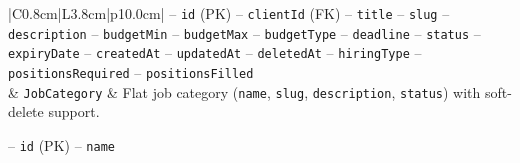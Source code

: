 \begin{center}
\begin{longtable}{|C{0.8cm}|L{3.8cm}|p{10.0cm}|}
\hspace*{1em}-- \texttt{id} (PK) \newline
\hspace*{1em}-- \texttt{client\allowbreak Id} (FK) \newline
\hspace*{1em}-- \texttt{title} \newline
\hspace*{1em}-- \texttt{slug} \newline
\hspace*{1em}-- \texttt{description} \newline
\hspace*{1em}-- \texttt{budget\allowbreak Min} \newline
\hspace*{1em}-- \texttt{budget\allowbreak Max} \newline
\hspace*{1em}-- \texttt{budget\allowbreak Type} \newline
\hspace*{1em}-- \texttt{deadline} \newline
\hspace*{1em}-- \texttt{status} \newline
\hspace*{1em}-- \texttt{expiry\allowbreak Date} \newline
\hspace*{1em}-- \texttt{created\allowbreak At} \newline
\hspace*{1em}-- \texttt{updated\allowbreak At} \newline
\hspace*{1em}-- \texttt{deleted\allowbreak At} \newline
\hspace*{1em}-- \texttt{hiring\allowbreak Type} \newline
\hspace*{1em}-- \texttt{positions\allowbreak Required} \newline
\hspace*{1em}-- \texttt{positions\allowbreak Filled} \\
 & \texttt{Job\allowbreak Category} & Flat job category (\texttt{name}, \texttt{slug}, \texttt{description}, \texttt{status}) with soft-delete support.\par\smallskip
\hspace*{1em}-- \texttt{id} (PK) \newline
\hspace*{1em}-- \texttt{name} \newline

\end{longtable}
\end{center}
